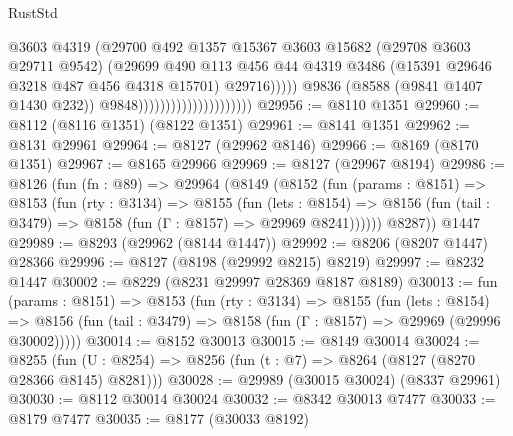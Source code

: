 \begin{lexlean}{RustStd}
\begin{coremodule}
                                                    @3603
                                                    @4319
                                                    (@29700
                                                      @492
                                                      @1357
                                                      @15367
                                                      @3603
                                                      @15682
                                                      (@29708 @3603 @29711 @9542)
                                                      (@29699
                                                        @490
                                                        @113
                                                        @456
                                                        @44
                                                        @4319
                                                        @3486
                                                        (@15391 @29646 @3218 @487 @456 @4318 @15701)
                                                        @29716)))))
                                              @9836
                                              (@8588 (@9841 @1407 @1430 @232))
                                              @9848)))))))))))))))))))))
@29956 := @8110 @1351
@29960 := @8112 (@8116 @1351) (@8122 @1351)
@29961 := @8141 @1351
@29962 := @8131 @29961
@29964 := @8127 (@29962 @8146)
@29966 := @8169 (@8170 @1351)
@29967 := @8165 @29966
@29969 := @8127 (@29967 @8194)
@29986 := @8126
    (fun (fn : @89) =>
    @29964
      (@8149
        (@8152
          (fun (params : @8151) =>
          @8153
            (fun (rty : @3134) =>
            @8155
              (fun (lets : @8154) =>
              @8156 (fun (tail : @3479) => @8158 (fun (Γ : @8157) => @29969 @8241))))))
        @8287))
    @1447
@29989 := @8293 (@29962 (@8144 @1447))
@29992 := @8206 (@8207 @1447) @28366
@29996 := @8127 (@8198 (@29992 @8215) @8219)
@29997 := @8232 @1447
@30002 := @8229 (@8231 @29997 @28369 @8187 @8189)
@30013 := fun (params : @8151) =>
  @8153
    (fun (rty : @3134) =>
    @8155
      (fun (lets : @8154) =>
      @8156 (fun (tail : @3479) => @8158 (fun (Γ : @8157) => @29969 (@29996 @30002)))))
@30014 := @8152 @30013
@30015 := @8149 @30014
@30024 := @8255
    (fun (U : @8254) => @8256 (fun (t : @7) => @8264 (@8127 (@8270 @28366 @8145) @8281)))
@30028 := @29989 (@30015 @30024) (@8337 @29961)
@30030 := @8112 @30014 @30024
@30032 := @8342 @30013 @7477
@30033 := @8179 @7477
@30035 := @8177 (@30033 @8192)

\end{coremodule}
\end{lexlean}
